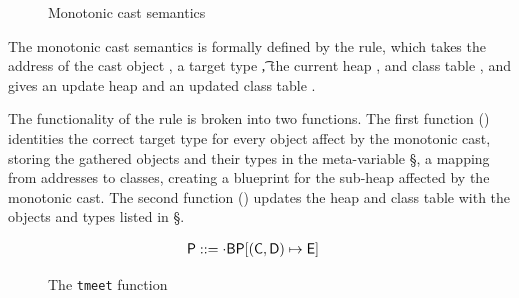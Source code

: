 \documentclass[a4paper,USenglish]{tex/lipics-v2016}
\begin{document}
\begin{figure}
\begin{mathpar}
\end{mathpar}
\caption{Monotonic cast semantics}
\label{fig:mono_sem}
\end{figure}

The monotonic cast semantics is formally defined by the  rule, 
which takes the address of the cast object \a, a target type \t, the current heap \s, 
and class table \K, and gives an update heap \sp and an updated class table \Kp.

The functionality of the  rule is broken into two functions.
The first function () identities the correct target type for
every object affect by the monotonic cast, storing the gathered objects and
their types in the meta-variable \S, a mapping from addresses to classes,
creating a blueprint for the sub-heap affected by the monotonic cast. The
second function () updates the heap and class table with the
objects and types listed in \S.

\begin{figure}[!ht]
\opdef{
  $\tmeet{\t}{\tp}\P\K = \tpp\,\Kp$
}{
}
\begin{align*}
\P &::= \cdot \B \Map\P{\Bind{(\C,\D)}\E}
\end{align*}
\begin{mathpar}




\end{mathpar}
\caption{The \texttt{tmeet} function}
\label{fig:tmeet_fun}
\end{figure}
\end{document}
